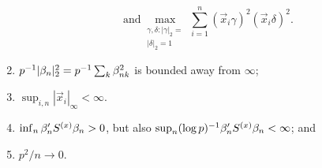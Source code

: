 \documentclass{article}
\newcounter{saveenumi}
\newcommand{\seti}{\setcounter{saveenumi}{\value{enumi}}}
\theoremstyle{remark}
\begin{document}
\begin{enumerate}
$$\text{and} 
\max_{\substack{\gamma, \delta: |\gamma|_{2}=\\ |\delta|_{2} =1}} \sum_{i=1}^{n}(\vec{x}_{i}\gamma)^{2} (\vec{x}_{i}\delta)^{2}.$$ 
\item \label{A-regPS} $p^{-1}|\betatrue|_{2}^{2} = p^{-1} \sum_k \betatrue[k]^2$ is bounded away from $\infty$;
\item \label{A-boundedXes} $\sup_{i,n}|\vec{x}_{i}|_{\infty}  <\infty$. 
\item\label{A-PSvar}  $\inf_{n}\betatrue'S^{(x)}\betatrue >0$,  but also $\sup_{n} (\log p)^{-1}\betatrue'S^{(x)}\betatrue  < \infty$; and
\item \label{A-rates} $p^{2}/n \rightarrow 0$.
%
\seti
\end{enumerate}
\end{document}
